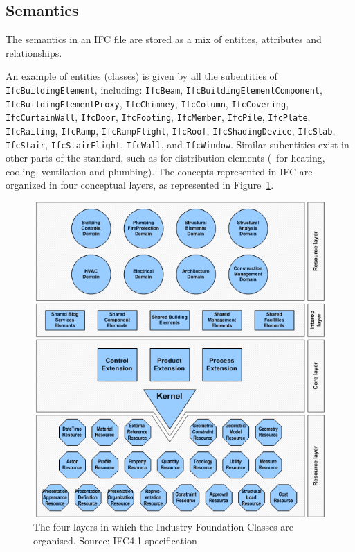 \subsection{Semantics}

The semantics in an IFC file are stored as a mix of entities, attributes and relationships.

An example of entities (classes) is given by all the subentities of \texttt{Ifc\-Buil\-ding\-E\-le\-ment}, including: \texttt{Ifc\-Beam}, \texttt{Ifc\-Buil\-ding\-E\-le\-ment\-Com\-po\-nent}, \texttt{Ifc\-Buil\-ding\-E\-le\-ment\-Pro\-xy}, \texttt{Ifc\-Chim\-ney}, \texttt{Ifc\-Co\-lumn}, \texttt{Ifc\-Co\-ve\-ring}, \texttt{Ifc\-Cur\-tain\-Wall}, \texttt{Ifc\-Door}, \texttt{Ifc\-Foo\-ting}, \texttt{Ifc\-Mem\-ber}, \texttt{Ifc\-Pile}, \texttt{Ifc\-Plate}, \texttt{Ifc\-Rai\-ling}, \texttt{Ifc\-Ramp}, \texttt{Ifc\-Ramp\-Flight}, \texttt{Ifc\-Roof}, \texttt{Ifc\-Sha\-ding\-De\-vice}, \texttt{Ifc\-Slab}, \texttt{Ifc\-Stair}, \texttt{Ifc\-Stair\-Flight}, \texttt{Ifc\-Wall}, and \texttt{Ifc\-Win\-dow}.
%
Similar subentities exist in other parts of the standard, such as for distribution elements (\eg\ for heating, cooling, ventilation and plumbing).
The concepts represented in IFC are organized in four conceptual layers, as represented in Figure~\ref{fig:ifclayers}.

\begin{figure}
	\begin{center}
		\includegraphics[width=\linewidth]{figs/IFC4LayeredArchitecture.png}
		\caption{{The four layers in which the Industry Foundation Classes are organised. Source: IFC4.1 specification}}%
		\label{fig:ifclayers}
	\end{center}
\end{figure}


